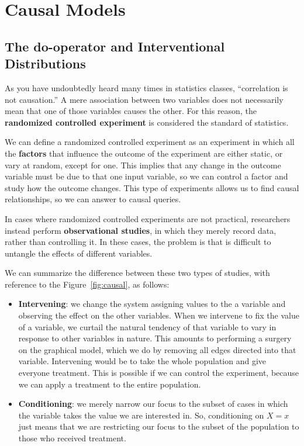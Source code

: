\chapter{Causal Models}
\section{The do-operator and Interventional Distributions}
As you have undoubtedly heard many times in statistics classes, “correlation is
not causation.” A mere association between two variables does not necessarily
mean that one of those variables causes the other. For this reason, the
\textbf{randomized controlled experiment} is considered the standard of statistics.

We can define a randomized controlled experiment as an experiment in which all
the \textbf{factors} that influence the outcome of the experiment are either
static, or vary at random, except for one. This implies that any change in the
outcome variable must be due to that one input variable, so we can control a factor
and study how the outcome changes. This type of experiments allows us to find causal
relationships, so we can answer to causal queries.

In cases where randomized controlled experiments are not practical, researchers
instead perform \textbf{observational studies}, in which they merely record data,
rather than controlling it. In these cases, the problem is that is difficult to
untangle the effects of different variables.

We can summarize the difference between these two types  of studies, with reference
to the Figure~\ref{fig:causal}, as follows:
\begin{itemize}
      \item \textbf{Intervening}: we change the system assigning values to the a
            variable and observing the effect on the other variables. When we
            intervene to fix the value of a variable, we curtail the natural
            tendency of that variable to vary in response to other variables in
            nature. This amounts to performing a surgery on the graphical model,
            which we do by removing all edges directed into that variable.
            Intervening would be to take the whole population and give everyone
            treatment. This is possible if we can control the experiment, because
            we can apply a treatment to the entire population.
      \item \textbf{Conditioning}: we merely narrow our focus to the subset of
            cases in which the variable takes the value we are interested in.
            So, conditioning on $X = x$ just means that we are restricting our
            focus to the subset of the population to those who received treatment.
\end{itemize}

